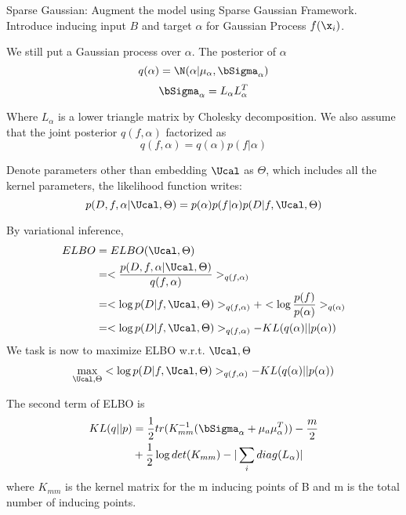 {\begin{comment}
\end{comment}


Sparse Gaussian:
Augment the model using Sparse Gaussian Framework.
Introduce inducing input $B$ and target $\alpha$ for Gaussian Process $f(\x_i)$.

We still put a Gaussian process over $\alpha$. The posterior of $\alpha$ 
$$q(\alpha) = \N( \alpha | \mu_\alpha, \bSigma_\alpha)$$
$$\bSigma_\alpha = L_\alpha L_\alpha^T$$

Where $L_\alpha$ is a lower triangle matrix by Cholesky decomposition. We also assume that the joint posterior $q( f,\alpha)$ factorized as
\begin{equation}
q(f,\alpha) = q(\alpha) p( f| \alpha) \label{eq:fac_post}
\end{equation}


Denote parameters other than embedding $\Ucal$ as $\Theta$, which includes all the kernel parameters, the likelihood function writes:
$$
p( D, f, \alpha | \Ucal, \Theta) = p( \alpha) p(f | \alpha) p( D | f, \Ucal, \Theta)
$$


By variational inference,
\begin{align*}
ELBO &= ELBO( \Ucal, \Theta)\\
	 &= < \frac{p( D, f, \alpha | \Ucal, \Theta)}{q(f,\alpha)} >_{ q(f,\alpha)}\\
	 &= < \log p( D | f, \Ucal, \Theta) >_{q( f, \alpha)} + < \log \frac{p(f)}{p(\alpha)}>_{ q(\alpha)}\\
	 &= < \log p( D | f, \Ucal, \Theta) >_{q( f, \alpha)} - KL( q(\alpha) || p(\alpha))
\end{align*}
We task is now to maximize ELBO w.r.t. $\Ucal, \Theta$ \label{eq:opt_ELBO}
\begin{align}
	\max_{\Ucal, \Theta} < \log p( D | f, \Ucal, \Theta) >_{q( f, \alpha)} - KL( q(\alpha) || p(\alpha))
\end{align} 

The second term of ELBO is
\begin{align}
KL( q || p) &= \frac{1}{2}tr( K_{mm}^{-1} ( \bSigma_\alpha + \mu_a \mu_\alpha^T)) - \frac{m}{2} \notag \\
&+ \frac{1}{2} \log det ( K_{mm}) - \vert \sum_i diag( L_\alpha) \vert \label{eq:KL}
\end{align}
where $K_{mm}$ is the kernel matrix for the m inducing points of B and m is the total number of inducing points.


}

